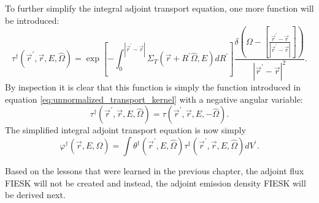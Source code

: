 To further simplify the integral adjoint transport equation, one more function
will be introduced:
\begin{equation}
  \tau^{\dagger}(\vec{r}^{'},\vec{r},E,\hat{\Omega}) = 
  \exp{\left[-\int_0^{|\vec{r}^{'} - \vec{r}|} 
      \Sigma_T(\vec{r}+R^{'}\hat{\Omega},E)dR^{'} \right]}
    \frac{\delta \left(\Omega - \left[\frac{\vec{r}^{'} - \vec{r}}
        {|\vec{r}^{'} - \vec{r}|}\right]\right)}
    {|\vec{r}^{'} - \vec{r}|^2}.
\end{equation}
By inspection it is clear that this function is simply the function 
introduced in equation \ref{eq:unnormalized_transport_kernel} with a negative
angular variable:
\begin{equation}
  \tau^{\dagger}(\vec{r}^{'},\vec{r},E,\hat{\Omega}) = 
  \tau(\vec{r}^{'},\vec{r},E,-\hat{\Omega}).
\end{equation}
The simplified integral adjoint transport equation is now simply
\begin{equation}
  \varphi^{\dagger}(\vec{r},E,\hat{\Omega}) = 
    \int \theta^{\dagger}(\vec{r}^{'},E,\hat{\Omega}) 
    \tau^{\dagger}(\vec{r}^{'},\vec{r},E,\hat{\Omega}) dV^{'}.
  \label{eq:volume_integral_adj_transport_eqn}
\end{equation}

Based on the lessons that were learned in the previous chapter, the adjoint
flux FIESK will not be created and instead, the adjoint emission density FIESK 
will be derived next.

